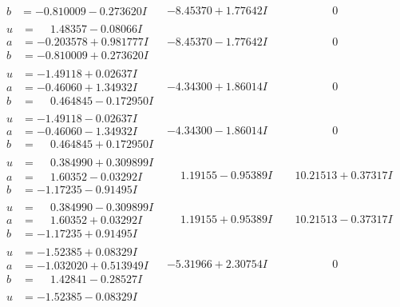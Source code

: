 \documentclass[1p]{elsarticle_modified}
\theoremstyle{definition}
\begin{document}
$$\begin{array}{c|c|c}
\begin{aligned}
b &= -0.810009 - 0.273620 I\end{aligned}
 & -8.45370 + 1.77642 I & \phantom{-0.000000 } 0 \\ \hline\begin{aligned}
u &= \phantom{-}1.48357 - 0.08066 I \\
a &= -0.203578 + 0.981777 I \\
b &= -0.810009 + 0.273620 I\end{aligned}
 & -8.45370 - 1.77642 I & \phantom{-0.000000 } 0 \\ \hline\begin{aligned}
u &= -1.49118 + 0.02637 I \\
a &= -0.46060 + 1.34932 I \\
b &= \phantom{-}0.464845 - 0.172950 I\end{aligned}
 & -4.34300 + 1.86014 I & \phantom{-0.000000 } 0 \\ \hline\begin{aligned}
u &= -1.49118 - 0.02637 I \\
a &= -0.46060 - 1.34932 I \\
b &= \phantom{-}0.464845 + 0.172950 I\end{aligned}
 & -4.34300 - 1.86014 I & \phantom{-0.000000 } 0 \\ \hline\begin{aligned}
u &= \phantom{-}0.384990 + 0.309899 I \\
a &= \phantom{-}1.60352 - 0.03292 I \\
b &= -1.17235 - 0.91495 I\end{aligned}
 & \phantom{-}1.19155 - 0.95389 I & \phantom{-}10.21513 + 0.37317 I \\ \hline\begin{aligned}
u &= \phantom{-}0.384990 - 0.309899 I \\
a &= \phantom{-}1.60352 + 0.03292 I \\
b &= -1.17235 + 0.91495 I\end{aligned}
 & \phantom{-}1.19155 + 0.95389 I & \phantom{-}10.21513 - 0.37317 I \\ \hline\begin{aligned}
u &= -1.52385 + 0.08329 I \\
a &= -1.032020 + 0.513949 I \\
b &= \phantom{-}1.42841 - 0.28527 I\end{aligned}
 & -5.31966 + 2.30754 I & \phantom{-0.000000 } 0 \\ \hline\begin{aligned}
u &= -1.52385 - 0.08329 I \\

\end{aligned}
\end{array}$$
\end{document}
